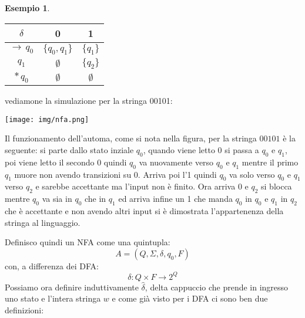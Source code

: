 \documentclass[a4paper]{book}
\theoremstyle{definition}%
\newtheorem*{esempio}{Esempio}
\begin{document}
\begin{esempio}
\begin{table}
\begin{tabular}{c|c|c}
\toprule $\delta$ & 0 & 1\\
\midrule
$\to \,q_0$ & $\{q_0,q_1\}$ & $\{q_1\}$\\
$q_1$ & $\emptyset$ & $\{q_2\}$\\
$*\, q_0$ & $\emptyset$ & $\emptyset$\\
\bottomrule
\end{tabular}
\end{table}
vediamone la simulazione per la stringa 00101:
\begin{center}
\texttt{[image: img/nfa.png]}
\end{center}
Il funzionamento dell'automa, come si nota nella figura, per la stringa $00101$ è la seguente:
si parte dallo stato inziale $q_0$, quando viene letto 0 si passa a $q_0$ e $q_1$,
poi viene letto il secondo 0 quindi $q_0$ va nuovamente verso $q_0$ e $q_1$ mentre il primo $q_1$ muore non avendo transizioni su 0.\newline
Arriva poi l'1 quindi $q_0$ va solo verso $q_0$ e $q_1$ verso $q_2$ e sarebbe accettante ma l'input non è finito.\newline
Ora arriva 0 e $q_2$ si blocca mentre $q_0$ va sia in $q_0$ che in $q_1$ ed arriva infine un 1 che manda $q_0$ in $q_0$ e $q_1$ in $q_2$
che è accettante e non avendo altri input si è dimostrata l'appartenenza della stringa al linguaggio.
\end{esempio}
Definisco quindi un NFA come una quintupla:
\[ A=(Q,\Sigma,\delta,q_0,F) \]
con, a differenza dei DFA:
\[ \delta:Q\times F\to 2^Q \]
Possiamo ora definire induttivamente $\hat{\delta}$, delta cappuccio che prende in ingresso uno stato e l'intera stringa $w$
e come già visto per i DFA ci sono ben due definizioni:
\end{document}
